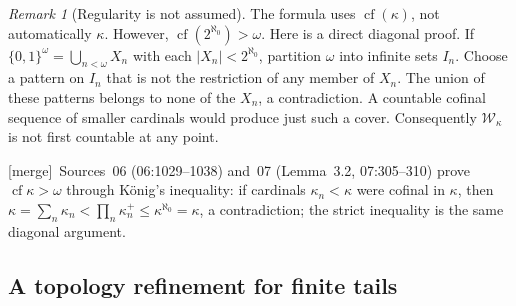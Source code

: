 \documentclass[11pt,a4paper]{article}
\theoremstyle{definition}
\theoremstyle{remark}
\newtheorem{remark}[theorem]{Remark}
\newcommand{\W}{\mathcal W}
\newcommand{\two}{\{0,1\}}
\newcommand{\cf}{\operatorname{cf}}
\newcommand{\merge}{\textsf{[merge]}}
\begin{document}
\begin{remark}[Regularity is not assumed]
The formula uses $\cf(\kappa)$, not automatically $\kappa$. However,
$\cf(2^{\aleph_0})>\omega$. Here is a direct diagonal proof. If
$\two^\omega=\bigcup_{n<\omega}X_n$ with each $|X_n|<2^{\aleph_0}$,
partition $\omega$ into infinite sets $I_n$. Choose a pattern on $I_n$ that
is not the restriction of any member of $X_n$. The union of these patterns
belongs to none of the $X_n$, a contradiction. A countable cofinal sequence
of smaller cardinals would produce just such a cover.
Consequently $\W_\kappa$ is not first countable at any point.
\end{remark}
\merge\ Sources~06 (06:1029--1038) and~07 (Lemma~3.2, 07:305--310) prove
$\cf\kappa>\omega$ through K\"onig's inequality: if cardinals $\kappa_n<\kappa$
were cofinal in $\kappa$, then
$\kappa=\sum_n\kappa_n<\prod_n\kappa_n^+\le\kappa^{\aleph_0}=\kappa$, a
contradiction; the strict inequality is the same diagonal argument.

\subsection{A topology refinement for finite tails}
\end{document}

